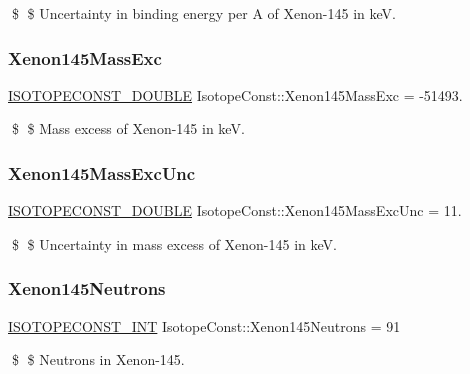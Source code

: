 \$ \$ Uncertainty in binding energy per A of Xenon-\/145 in keV. \mbox{\label{group___isotope_const-_xenon-_xe145_ga037b058fd89280f48d85411d3e30f4bc}} 
\subsubsection{\texorpdfstring{Xenon145\+Mass\+Exc}{Xenon145MassExc}}
{\footnotesize\ttfamily \mbox{\hyperlink{group___isotope_const-_macros_ga8f45a7272ce02c0b4c65c44636ed719a}{I\+S\+O\+T\+O\+P\+E\+C\+O\+N\+S\+T\+\_\+\+D\+O\+U\+B\+LE}} Isotope\+Const\+::\+Xenon145\+Mass\+Exc = -\/51493.}

\$ \$ Mass excess of Xenon-\/145 in keV. \mbox{\label{group___isotope_const-_xenon-_xe145_ga1ab6e49044ff59a7b406a9cf6fa0a4e9}} 
\subsubsection{\texorpdfstring{Xenon145\+Mass\+Exc\+Unc}{Xenon145MassExcUnc}}
{\footnotesize\ttfamily \mbox{\hyperlink{group___isotope_const-_macros_ga8f45a7272ce02c0b4c65c44636ed719a}{I\+S\+O\+T\+O\+P\+E\+C\+O\+N\+S\+T\+\_\+\+D\+O\+U\+B\+LE}} Isotope\+Const\+::\+Xenon145\+Mass\+Exc\+Unc = 11.}

\$ \$ Uncertainty in mass excess of Xenon-\/145 in keV. \mbox{\label{group___isotope_const-_xenon-_xe145_ga22f96c982067e48fec2bf30f96f3c522}} 
\subsubsection{\texorpdfstring{Xenon145\+Neutrons}{Xenon145Neutrons}}
{\footnotesize\ttfamily \mbox{\hyperlink{group___isotope_const-_macros_ga5f18360b3e99483a35c32d789e62621c}{I\+S\+O\+T\+O\+P\+E\+C\+O\+N\+S\+T\+\_\+\+I\+NT}} Isotope\+Const\+::\+Xenon145\+Neutrons = 91}

\$ \$ Neutrons in Xenon-\/145. \mbox{\label{group___isotope_const-_xenon-_xe145_gad1b20fcbcf45bf971b9041a2c1a9127f}} 
